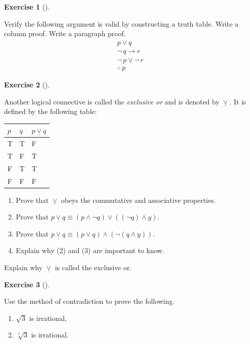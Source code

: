\documentclass[
  letterpaper,
  10pt,
  reqno,
  twopage,
  openany]{book}
\providecommand{\tightlist}{%
  \setlength{\itemsep}{0pt}\setlength{\parskip}{0pt}}\usepackage{longtable,booktabs,array}
\theoremstyle{plain}
\theoremstyle{definition}
\newtheorem{exercise}{Exercise}[chapter]
\theoremstyle{definition}
\theoremstyle{definition}
\theoremstyle{plain}
\theoremstyle{plain}
\theoremstyle{remark}
\begin{document}
\leavevmode{}%
\begin{exercise}[]\label{exr-truth-table-proof}

Verify the following argument is valid by constructing a truth table.
Write a column proof. Write a paragraph proof.\\
\[ 
\begin{array}{l} p \lor q \\ \neg \, q \rightarrow r \\  \neg \, p \lor \neg \, r \\ \hline \therefore \, p \end{array}
\]

\end{exercise}

\leavevmode{}%
\begin{exercise}[]\label{exr-exclusive-or}

Another logical connective is called the \emph{exclusive or} and is
denoted by \(\underline{\lor}\). It is defined by the following table:

\begin{longtable}[]{@{}lll@{}}
\toprule()
\(p\) & \(q\) & \(p\underline{\lor} q\) \\
\midrule()
\endhead
T & T & F \\
T & F & T \\
F & T & T \\
F & F & F \\
\bottomrule()
\end{longtable}

\begin{enumerate}
\def\labelenumi{\arabic{enumi}.}
\tightlist
\item
  Prove that \(\underline{\lor}\) obeys the commutative and associative
  properties.
\item
  Prove that
  \(p\underline{\lor}q\equiv (p\land \neg q)\lor ((\neg q)\land y)\).
\item
  Prove that
  \(p\underline{\lor}q\equiv (p\lor q)\land (\neg (q\land y))\).
\item
  Explain why (2) and (3) are important to know.
\end{enumerate}

Explain why \(\underline{\lor}\) is called the exclusive or.

\end{exercise}

\leavevmode{}%
\begin{exercise}[]\label{exr-contradiction-irrational}

Use the method of contradiction to prove the following.

\begin{enumerate}
\def\labelenumi{\arabic{enumi}.}
\tightlist
\item
  \(\sqrt{3}\) is irrational,
\item
  \(\sqrt[5]{3}\) is irrational.
\end{enumerate}

\end{exercise}
\end{document}
